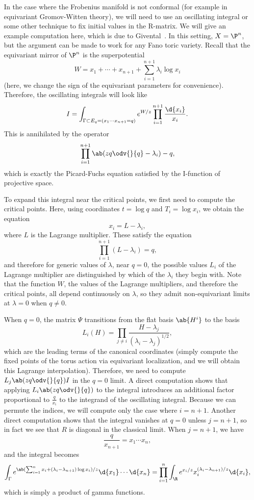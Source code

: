 In the case where the Frobenius manifold is not conformal (for example in equivariant Gromov-Witten theory), we will need to use an oscillating integral or some other technique to fix initial values in the R-matrix. We will give an example computation here, which is due to Givental~\cite{Givental2001semisimple}. In this setting, \(X = \P^n\), but the argument can be made to work for any Fano toric variety. Recall that the equivariant mirror of \(\P^n\) is the superpotential
\[ W = x_1 + \cdots + x_{n+1} + \sum_{i=1}^{n+1} \lambda_i \log x_i \]
(here, we change the sign of the equivariant parameters for convenience). Therefore, the oscillating integrals will look like
\[ I = \int_{\Gamma \subset E_q = (x_1 \cdots x_{n+1}=q)} e^{W/z} \prod_{i=1}^{n+1} \frac{\d{x_i}}{x_i}. \]
This is annihilated by the operator 
\[ \prod_{i=1}^{n+1}\ab(zq \odv{}{q} -\lambda_i) - q, \]
which is exactly the Picard-Fuchs equation satisfied by the I-function of projective space.

To expand this integral near the critical points, we first need to compute the critical points. Here, using coordinates \(t = \log q\) and \(T_i = \log x_i\), we obtain the equation
\[ x_i = L - \lambda_i, \]
where \(L\) is the Lagrange multiplier. These satisfy the equation
\[ \prod_{i=1}^{n+1} (L - \lambda_i) = q, \]
and therefore for generic values of \(\lambda\), near \(q = 0\), the possible values \(L_i\) of the Lagrange multiplier are distinguished by which of the \(\lambda_i\) they begin with. Note that the function \(W\), the values of the Lagrange multipliers, and therefore the critical points, all depend continuously on \(\lambda\), so they admit non-equivariant limits at \(\lambda = 0\) when \(q \neq 0\).

When \(q = 0\), the matrix \(\Psi\) transitions from the flat basis \(\ab{H^i}\) to the basis
\[ L_i(H) = \prod_{j \neq i} \frac{H - \lambda_j}{(\lambda_i - \lambda_j)^{1/2}}, \]
which are the leading terms of the canonical coordinates (simply compute the fixed points of the torus action via equivariant localization, and we will obtain this Lagrange interpolation). Therefore, we need to compute \(L_j \ab(z q \odv{}{q}) I\) in the \(q = 0\) limit. A direct computation shows that applying \(L_i \ab(z q \odv{}{q})\) to the integral introduces an additional factor proportional to \(\frac{q}{x_i}\) to the integrand of the oscillating integral. Because we can permute the indices, we will compute only the case where \(i = n+1\). Another direct computation shows that the integral vanishes at \(q = 0\) unless \( j = n+1\), so in fact we see that \(R\) is diagonal in the classical limit. When \(j = n+1\), we have
\[ \frac{q}{x_{n+1}} = x_1 \cdots x_n, \]
and the integral becomes
\[ \int_{\Gamma} e^{\ab( \sum_{i=1}^n x_i + (\lambda_i - \lambda_{n+1})\log x_i ) / z} \d{x_1} \cdots \d{x_n} = \prod_{i=1}^n \int_{\R} e^{x_i/z} x_i^{(\lambda_i - \lambda_{n+1})/z} \d{x_i}, \]
which is simply a product of gamma functions.

